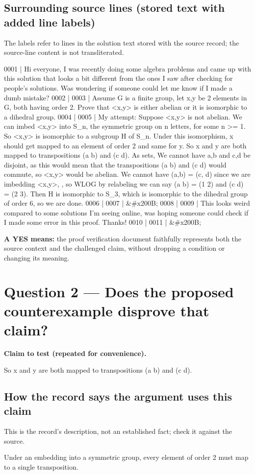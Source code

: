 \documentclass[11pt]{article}
\begin{document}
\subsection*{Surrounding source lines (stored text with added line labels)}
The labels refer to lines in the solution text stored with the source record; the source-line content is not transliterated.
\begin{Vsrc}
0001 | Hi everyone, I was recently doing some algebra problems and came up with this solution that looks a bit different from the ones I saw after checking for people's solutions.  Was wondering if someone could let me know if I made a dumb mistake?
0002 | 
0003 | Assume G is a finite group, let x,y be 2 elements in G, both having order 2.  Prove that <x,y> is either abelian or it is isomorphic to a dihedral group.  
0004 | 
0005 | My attempt:  Suppose <x,y> is not abelian.  We can imbed <x,y> into S\_n, the symmetric group on n letters, for some n >= 1.  So <x,y> is isomorphic to a subgroup H of  S\_n.  Under this isomorphism, x should get mapped to an element of order 2 and same for y.  So x and y are both mapped to transpositions (a b) and (c d).  As sets, We cannot have {a,b} and {c,d} be disjoint, as this would mean that the transpositions (a b) and (c d) would commute, so <x,y> would be abelian.  We cannot have (a,b) = (c, d) since we are imbedding <x,y>, , so WLOG by relabeling we can say (a b) = (1 2) and (c d) = (2 3).  Then H is isomorphic to S\_3, which is isomorphic to the dihedral group of order 6, so we are done.  
0006 | 
0007 | &#x200B;
0008 | 
0009 | This looks weird compared to some solutions I'm seeing online, was hoping someone could check if I made some error in this proof.  Thanks!
0010 | 
0011 | &#x200B;
\end{Vsrc}
\textbf{A YES means:} the proof verification document faithfully represents both the source context and the challenged claim, without dropping a condition or changing its meaning.
\section*{Question 2 --- Does the proposed counterexample disprove that claim?}
\textbf{Claim to test (repeated for convenience).}
\begin{Vsrc}
So x and y are both mapped to transpositions (a b) and (c d).
\end{Vsrc}
\subsection*{How the record says the argument uses this claim}
This is the record's description, not an established fact; check it against the source.
\begin{Vsrc}
Under an embedding into a symmetric group, every element of order 2 must map to a single transposition.
\end{Vsrc}
\end{document}
